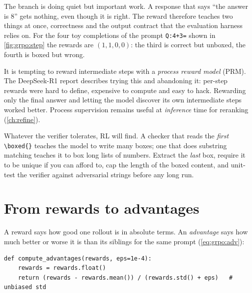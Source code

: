 The  branch is doing quiet but important work. A response that says ``the answer
is 8'' gets nothing, even though it is right. The reward therefore teaches two things at
once, correctness and the output contract that the evaluation harness relies on. For the
four toy completions of the prompt \verb|Q:4+3=| shown in \cref{fig:grpo:step} the rewards
are $(1,1,0,0)$: the third is correct but unboxed, the fourth is boxed but wrong.

\begin{keyidea}
It is tempting to reward intermediate steps with a \emph{process reward model} (PRM).
The DeepSeek-R1 report describes trying this and abandoning it: per-step rewards were hard
to define, expensive to compute and easy to hack. Rewarding only the final answer and
letting the model discover its own intermediate steps worked better. Process supervision
remains useful at \emph{inference} time for reranking (\cref{ch:refine}).
\end{keyidea}

\begin{pitfall}
Whatever the verifier tolerates, RL will find. A checker that reads the \emph{first}
\verb|\boxed{}| teaches the model to write many boxes; one that does substring matching
teaches it to box long lists of numbers. Extract the \emph{last} box, require it to be
unique if you can afford to, cap the length of the boxed content, and unit-test the
verifier against adversarial strings before any long run.
\end{pitfall}

\section{From rewards to advantages}\label{sec:grpo:adv}

A reward says how good one rollout is in absolute terms. An \emph{advantage} says how much
better or worse it is than its siblings for the same prompt (\cref{eq:grpo:adv}):

\begin{lstlisting}[caption={Group-relative advantages.},label={lst:grpo:adv}]
def compute_advantages(rewards, eps=1e-4):
    rewards = rewards.float()
    return (rewards - rewards.mean()) / (rewards.std() + eps)   # unbiased std
\end{lstlisting}

